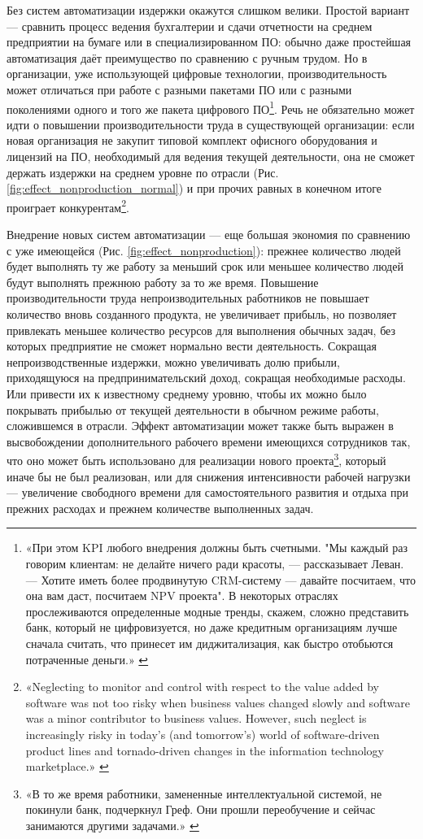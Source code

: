 \documentclass{article}
\begin{document}
Без систем автоматизации издержки окажутся слишком велики. Простой вариант — сравнить процесс ведения бухгалтерии и сдачи отчетности на среднем предприятии на бумаге или в специализированном ПО: обычно даже простейшая автоматизация даёт преимущество по сравнению с ручным трудом. Но в организации, уже использующей цифровые технологии, производительность может отличаться при работе с разными пакетами ПО или с разными поколениями одного и того же пакета цифрового ПО\footnote{«При этом KPI любого внедрения должны быть счетными. "Мы каждый раз говорим клиентам: не делайте ничего ради красоты, — рассказывает Леван. — Хотите иметь более продвинутую CRM-систему — давайте посчитаем, что она вам даст, посчитаем NPV проекта". В некоторых отраслях прослеживаются определенные модные тренды, скажем, сложно представить банк, который не цифровизуется, но даже кредитным организациям лучше сначала считать, что принесет им диджитализация, как быстро отобьются потраченные деньги.» \cite{vedomostiItIsReal}}. Речь не обязательно может идти о повышении производительности труда в существующей организации: если новая организация не закупит типовой комплект офисного оборудования и лицензий на ПО, необходимый для ведения текущей деятельности, она не сможет держать издержки на среднем уровне по отрасли (Рис. \ref{fig:effect_nonproduction_normal}) и при прочих равных в конечном итоге проиграет конкурентам\footnote{«Neglecting to monitor and control with respect to the value added by software was not too risky when business values changed slowly and software was a minor contributor to business values. However, such neglect is increasingly risky in today’s (and tomorrow’s) world of software-driven product lines and tornado-driven changes in the information technology marketplace.» \cite{valueBasedSoftware2003}}.

Внедрение новых систем автоматизации — еще большая  экономия по сравнению с уже имеющейся (Рис. \ref{fig:effect_nonproduction}): прежнее количество людей будет выполнять ту же работу за меньший срок или меньшее количество людей будут выполнять прежнюю работу за то же время.
Повышение производительности труда непроизводительных работников не повышает количество вновь созданного продукта, не увеличивает прибыль, но позволяет привлекать меньшее количество ресурсов для выполнения обычных задач, без которых предприятие не сможет нормально вести деятельность. Сокращая непроизводственные издержки, можно увеличивать долю прибыли, приходящуюся на предпринимательский доход, сокращая необходимые расходы. Или привести их к известному среднему уровню, чтобы их можно было покрывать прибылью от текущей деятельности в обычном режиме работы, сложившемся в отрасли. Эффект автоматизации может также быть выражен в высвобождении дополнительного рабочего времени имеющихся сотрудников так, что оно может быть использовано для реализации нового проекта\footnote{«В то же время работники, замененные интеллектуальной системой, не покинули банк, подчеркнул Греф. Они прошли переобучение и сейчас занимаются другими задачами.» \cite{sberAiJobcut2018}}, который иначе бы не был реализован, или для снижения интенсивности рабочей нагрузки — увеличение свободного времени для самостоятельного развития и отдыха при прежних расходах и прежнем количестве выполненных задач.
\end{document}
